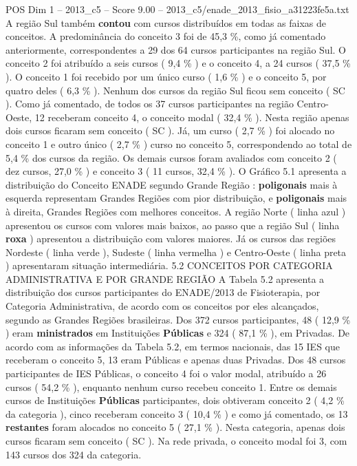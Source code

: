 \begin{textsample}{POS Dim 1 – 2013\_c5 – Score 9.00 – 2013\_c5/enade\_2013\_fisio\_a31223fe5a.txt}
A região Sul também \textbf{contou} com cursos distribuídos em todas as faixas de conceitos.
A predominância do conceito 3 foi de 45,3 \%, como já comentado anteriormente, correspondentes a 29 dos 64 cursos participantes na região Sul.
O conceito 2 foi atribuído a seis cursos ( 9,4 \% ) e o conceito 4, a 24 cursos ( 37,5 \% ).
O conceito 1 foi recebido por um único curso ( 1,6 \% ) e o conceito 5, por quatro deles ( 6,3 \% ).
Nenhum dos cursos da região Sul ficou sem conceito ( SC ).
Como já comentado, de todos os 37 cursos participantes na região Centro-Oeste, 12 receberam conceito 4, o conceito modal ( 32,4 \% ).
Nesta região apenas dois cursos ficaram sem conceito ( SC ).
Já, um curso ( 2,7 \% ) foi alocado no conceito 1 e outro único ( 2,7 \% ) curso no conceito 5, correspondendo ao total de 5,4 \% dos cursos da região.
Os demais cursos foram avaliados com conceito 2 ( dez cursos, 27,0 \% ) e conceito 3 ( 11 cursos, 32,4 \% ).
O Gráfico 5.1 apresenta a distribuição do Conceito ENADE segundo Grande Região : \textbf{poligonais} mais à esquerda representam Grandes Regiões com pior distribuição, e \textbf{poligonais} mais à direita, Grandes Regiões com melhores conceitos.
A região Norte ( linha azul ) apresentou os cursos com valores mais baixos, ao passo que a região Sul ( linha \textbf{roxa} ) apresentou a distribuição com valores maiores.
Já os cursos das regiões Nordeste ( linha verde ), Sudeste ( linha vermelha ) e Centro-Oeste ( linha preta ) apresentaram situação intermediária. 5.2 CONCEITOS POR CATEGORIA ADMINISTRATIVA E POR GRANDE REGIÃO A Tabela 5.2 apresenta a distribuição dos cursos participantes do ENADE/2013 de Fisioterapia, por Categoria Administrativa, de acordo com os conceitos por eles alcançados, segundo as Grandes Regiões brasileiras.
Dos 372 cursos participantes, 48 ( 12,9 \% ) eram \textbf{ministrados} em Instituições \textbf{Públicas} e 324 ( 87,1 \% ), em Privadas.
De acordo com as informações da Tabela 5.2, em termos nacionais, das 15 IES que receberam o conceito 5, 13 eram Públicas e apenas duas Privadas.
Dos 48 cursos participantes de IES Públicas, o conceito 4 foi o valor modal, atribuído a 26 cursos ( 54,2 \% ), enquanto nenhum curso recebeu conceito 1.
Entre os demais cursos de Instituições \textbf{Públicas} participantes, dois obtiveram conceito 2 ( 4,2 \% da categoria ), cinco receberam conceito 3 ( 10,4 \% ) e como já comentado, os 13 \textbf{restantes} foram alocados no conceito 5 ( 27,1 \% ).
Nesta categoria, apenas dois cursos ficaram sem conceito ( SC ).
Na rede privada, o conceito modal foi 3, com 143 cursos dos 324 da categoria.

\end{textsample}
